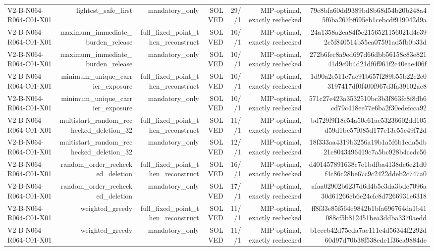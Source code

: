 {\begin{longtable}{lrrrrrr}
V2-B-N064-R064-C01-X01 & lightest\_safe\_first & mandatory\_only & SOLVED & 29//1 & MIP-optimal, exactly rechecked & 79c8bfa60dd9389bd8b68d54b20b248a45f6ba267bf695eb1cebcdf919042d9a \\
V2-B-N064-R064-C01-X01 & maximum\_immediate\_burden\_release & full\_fixed\_point\_then\_reconstruct & SOLVED & 10//1 & MIP-optimal, exactly rechecked & 24a1358a2ea84f5e2156521156021d4c392c5f840514b55ea07591ad5fb0b33d \\
V2-B-N064-R064-C01-X01 & maximum\_immediate\_burden\_release & mandatory\_only & SOLVED & 10//1 & MIP-optimal, exactly rechecked & 272b6fec8a9ed697d66dbb56158c83e82141d9c9b4d21df6f961f2c40eae406f \\
V2-B-N064-R064-C01-X01 & minimum\_unique\_carrier\_exposure & full\_fixed\_point\_then\_reconstruct & SOLVED & 10//1 & MIP-optimal, exactly rechecked & 1d90a2e511e7ac91b657f289b55b22e2e03197417df0f400f967d3fa39102ae8 \\
V2-B-N064-R064-C01-X01 & minimum\_unique\_carrier\_exposure & mandatory\_only & SOLVED & 10//1 & MIP-optimal, exactly rechecked & 571c27e423a3532510bc3b3f863fc8f8db6cd79c418ee77e6ba2f30edefcca92 \\
V2-B-N064-R064-C01-X01 & multistart\_random\_rechecked\_deletion\_32 & full\_fixed\_point\_then\_reconstruct & SOLVED & 11//1 & MIP-optimal, exactly rechecked & bd729f9f18e54a50e61ac53236602dd105d59d1be57f085d177e13c55c49f72d \\
V2-B-N064-R064-C01-X01 & multistart\_random\_rechecked\_deletion\_32 & mandatory\_only & SOLVED & 12//1 & MIP-optimal, exactly rechecked & 18f333aa4319b3256a19b1a5f6b1eda5db21c8043496419c7a5bc928b4ccdc56 \\
V2-B-N064-R064-C01-X01 & random\_order\_rechecked\_deletion & full\_fixed\_point\_then\_reconstruct & SOLVED & 16//1 & MIP-optimal, exactly rechecked & d401457891638c7e1bdfba4138de6e21d0f4c86c28be67c9c2422ddeb2c747a0 \\
V2-B-N064-R064-C01-X01 & random\_order\_rechecked\_deletion & mandatory\_only & SOLVED & 17//1 & MIP-optimal, exactly rechecked & afaa02902b6237d6d4b5c3da3bde7096a30d61266cb6e24cfc8d7266931e6318 \\
V2-B-N064-R064-C01-X01 & weighted\_greedy & full\_fixed\_point\_then\_reconstruct & SOLVED & 11//1 & MIP-optimal, exactly rechecked & ff8f33e85f564e9842b1bfa696764da1b41088cf5b812451bea3ddba3370aedd \\
V2-B-N064-R064-C01-X01 & weighted\_greedy & mandatory\_only & SOLVED & 11//1 & MIP-optimal, exactly rechecked & b1cecb42d75eda7ae111c4d56344f2292d60d97d70b38f538ede1f36ea9884de \\

\end{longtable}}
